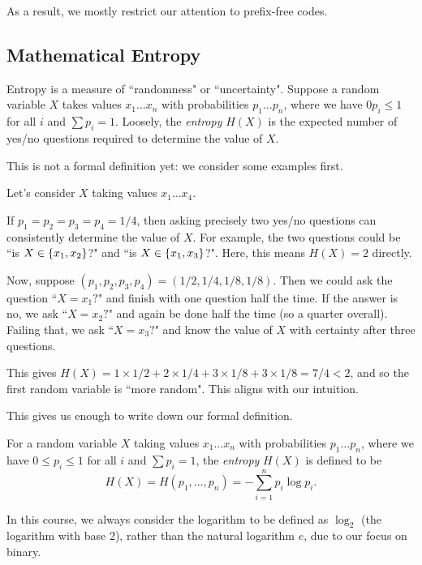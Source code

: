 \documentclass{article}
\begin{document}
As a result, we mostly restrict our attention to prefix-free codes.


\subsection{Mathematical Entropy}

Entropy is a measure of ``randomness" or ``uncertainty". Suppose a random variable $X$ takes values $x_1 \dots x_n$ with probabilities $p_1 \dots p_n$, where we have $0 p_i \leq 1$ for all $i$ and $\sum p_i = 1$. Loosely, the \textit{entropy} $H(X)$ is the expected number of yes/no questions required to determine the value of $X$.

This is not a formal definition yet: we consider some examples first.

\begin{example}
	Let's consider $X$ taking values $x_1 \dots x_4$.
    
    If $p_1 = p_2 = p_3 = p_4 = 1/4$, then asking precisely two yes/no questions can consistently determine the value of $X$. For example, the two questions could be ``is $X \in \left\lbrace x_1, x_2 \right\rbrace$?" and ``is $X \in \left\lbrace x_1, x_3 \right\rbrace$?". Here, this means $H(X) = 2$ directly.
    
    Now, suppose $(p_1, p_2, p_3, p_4) = (1/2, 1/4, 1/8, 1/8)$. Then we could ask the question ``$X = x_1?$" and finish with one question half the time. If the answer is no, we ask ``$X = x_2?$" and again be done half the time (so a quarter overall). Failing that, we ask ``$X = x_3?$" and know the value of $X$ with certainty after three questions.
    
    This gives $H(X) = 1 \times 1/2 + 2 \times 1/4 + 3 \times 1/8 +  3 \times 1/8 = 7/4 < 2$, and so the first random variable is ``more random". This aligns with our intuition.
\end{example}

This gives us enough to write down our formal definition.
\begin{definition}[Entropy]
    For a random variable $X$ taking values $x_1 \dots x_n$ with probabilities $p_1 \dots p_n$, where we have $0 \leq p_i \leq 1$ for all $i$ and $\sum p_i = 1$, the \textit{entropy} $H(X)$ is defined to be
    \[
	H(X) = H(p_1, \dots, p_n) = -\sum_{i=1}^n p_i \log p_i.
	\]
\end{definition}
\begin{note}
	In this course, we always consider the logarithm to be defined as $\log_2$ (the logarithm with base 2), rather than the natural logarithm $e$, due to our focus on binary.
\end{note}
\end{document}
